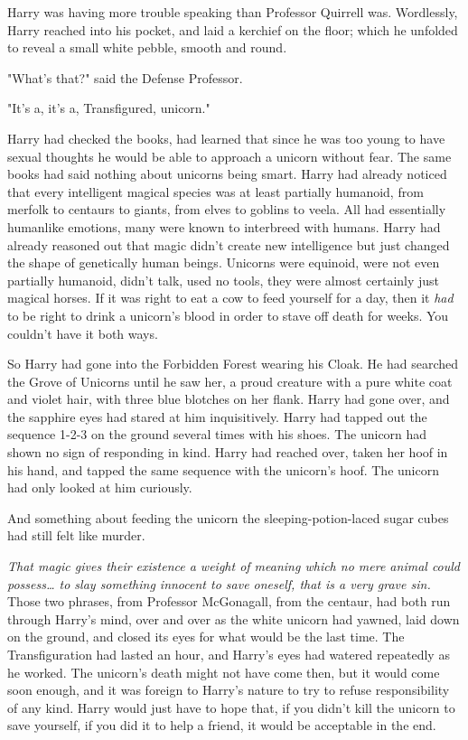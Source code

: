 Harry was having more trouble speaking than Professor Quirrell was. Wordlessly, 
Harry reached into his pocket, and laid a kerchief on the floor; which he 
unfolded to reveal a small white pebble, smooth and round.

"What's that?" said the Defense Professor.

"It's a, it's a, Transfigured, unicorn."

Harry had checked the books, had learned that since he was too young to have 
sexual thoughts he would be able to approach a unicorn without fear. The same 
books had said nothing about unicorns being smart. Harry had already noticed 
that every intelligent magical species was at least partially humanoid, from 
merfolk to centaurs to giants, from elves to goblins to veela. All had 
essentially humanlike emotions, many were known to interbreed with humans. 
Harry had already reasoned out that magic didn't create new intelligence but 
just changed the shape of genetically human beings. Unicorns were equinoid, 
were not even partially humanoid, didn't talk, used no tools, they were almost 
certainly just magical horses. If it was right to eat a cow to feed yourself 
for a day, then it \emph{had} to be right to drink a unicorn's blood in order 
to stave off death for weeks. You couldn't have it both ways.

So Harry had gone into the Forbidden Forest wearing his Cloak. He had searched 
the Grove of Unicorns until he saw her, a proud creature with a pure white coat 
and violet hair, with three blue blotches on her flank. Harry had gone over, 
and the sapphire eyes had stared at him inquisitively. Harry had tapped out the 
sequence 1-2-3 on the ground several times with his shoes. The unicorn had 
shown no sign of responding in kind. Harry had reached over, taken her hoof in 
his hand, and tapped the same sequence with the unicorn's hoof. The unicorn had 
only looked at him curiously.

And something about feeding the unicorn the sleeping-potion-laced sugar cubes 
had still felt like murder.

\emph{That magic gives their existence a weight of meaning which no mere animal 
could possess{\ldots} to slay something innocent to save oneself, that is a 
very grave sin.} Those two phrases, from Professor McGonagall, from the 
centaur, had both run through Harry's mind, over and over as the white unicorn 
had yawned, laid down on the ground, and closed its eyes for what would be the 
last time. The Transfiguration had lasted an hour, and Harry's eyes had watered 
repeatedly as he worked. The unicorn's death might not have come then, but it 
would come soon enough, and it was foreign to Harry's nature to try to refuse 
responsibility of any kind. Harry would just have to hope that, if you didn't 
kill the unicorn to save yourself, if you did it to help a friend, it would be 
acceptable in the end.

